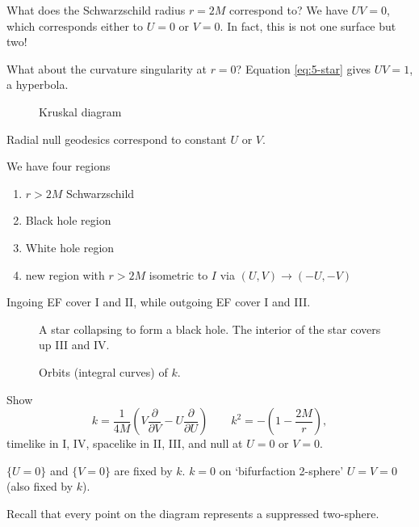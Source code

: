 What does the Schwarzschild radius $r = 2M$ correspond to?
We have  $U V = 0$, which corresponds either to  $U = 0$ or  $V = 0$. In fact, this is not one surface but two!

What about the curvature singularity at  $r = 0$?
Equation  \eqref{eq:5-star} gives $UV = 1$, a hyperbola.
 \begin{figure}[tbhp]
  \centering
  \def\svgwidth{0.8\columnwidth}
  
  \caption{Kruskal diagram}
  \label{fig:l5f2}
\end{figure} 
Radial null geodesics correspond to constant $U$  or $V$.

We have four regions
 \begin{enumerate}[I:]
  \item $r > 2M$ Schwarzschild
  \item Black hole region
  \item White hole region
  \item new region with $r > 2M$ isometric to $I$ via $(U, V) \to (-U, -V)$
\end{enumerate}
\begin{leftbar}
  Ingoing EF cover I and II, while outgoing EF cover I and III.
\end{leftbar}

\begin{figure}[tbhp]
  \centering
  \begin{minipage}[t]{0.5\textwidth}
    \centering
    \def\svgwidth{0.8\columnwidth}
    
    \caption{A star collapsing to form a black hole. The interior of the star covers up III and IV.}
    \label{fig:l5f3}
  \end{minipage}%
  \begin{minipage}[t]{0.5\textwidth}
    \centering
    \def\svgwidth{0.8\columnwidth}
    
    \caption{Orbits (integral curves) of $k$.}
    \label{fig:l5f4}
  \end{minipage}
\end{figure}


\begin{exercise}
  Show 
  \begin{equation}
    k = \frac{1}{4M} \left( V \frac{\partial }{\partial V} - U \frac{\partial }{\partial U} \right) \qquad k^2 = - \left( 1 - \frac{2M}{r} \right),
  \end{equation} 
  timelike in I, IV, spacelike in II, III, and null at $U = 0$ or $V = 0$.
\end{exercise}

$\{U = 0\}$ and $\{V = 0\}$ are fixed by $k$.
$k = 0$ on `bifurfaction 2-sphere' $U = V = 0$ (also fixed by $k$).
\begin{leftbar}
  Recall that every point on the diagram represents a suppressed two-sphere.
\end{leftbar}
